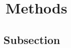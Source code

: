 \graphicspath{{images/}}

\section{\thesection~Methods}
\label{sec:methods}

\subsection{\thesubsection~Subsection}

